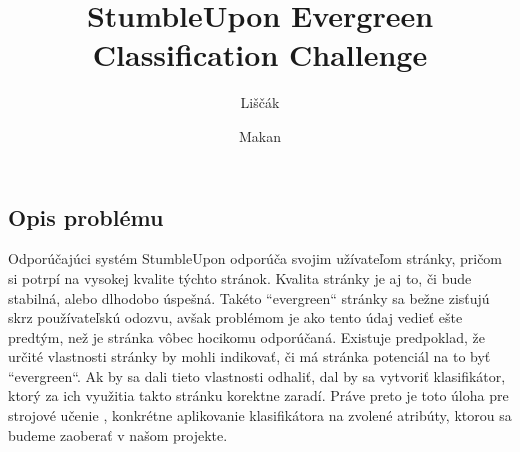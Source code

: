 \documentclass{iitsrc}
\title{StumbleUpon Evergreen Classification Challenge}
\author{Liščák}{Tomáš}
\author{Makan}{Branislav}
\begin{document}
\maketitle

\begin{multicols}{2}
\raggedcolumns

\section{Opis problému}
Odporúčajúci systém StumbleUpon odporúča svojim užívateľom stránky, pričom si potrpí na vysokej kvalite týchto stránok. Kvalita stránky je aj to, či bude stabilná, alebo dlhodobo úspešná. Takéto ``evergreen`` stránky sa bežne zisťujú skrz používateľskú odozvu, avšak problémom je ako tento údaj vedieť ešte predtým, než je stránka vôbec hocikomu odporúčaná. Existuje predpoklad, že určité vlastnosti stránky by mohli indikovať, či má stránka potenciál na to byť ``evergreen``. Ak by sa dali tieto vlastnosti odhaliť, dal by sa vytvoriť klasifikátor, ktorý za ich využitia takto stránku korektne zaradí. Práve preto je toto úloha pre strojové učenie , konkrétne aplikovanie klasifikátora na zvolené atribúty, ktorou sa budeme zaoberať v našom projekte.


\end{multicols}
\end{document}
